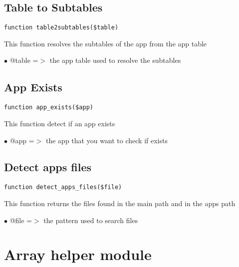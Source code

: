 \documentclass[a4paper]{book}
\begin{document}
\hypertarget{toc31}{}
\subsection{Table to Subtables}

\begin{lstlisting}
function table2subtables($table)
\end{lstlisting}

This function resolves the subtables of the app from the app table

\begin{compactitem}
\item[\color{myblue}$\bullet$] @table =$>$ the app table used to resolve the subtables
\end{compactitem}

\hypertarget{toc32}{}
\subsection{App Exists}

\begin{lstlisting}
function app_exists($app)
\end{lstlisting}

This function detect if an app exists

\begin{compactitem}
\item[\color{myblue}$\bullet$] @app =$>$ the app that you want to check if exists
\end{compactitem}

\hypertarget{toc33}{}
\subsection{Detect apps files}

\begin{lstlisting}
function detect_apps_files($file)
\end{lstlisting}

This function returns the files found in the main path and in the apps path

\begin{compactitem}
\item[\color{myblue}$\bullet$] @file =$>$ the pattern used to search files
\end{compactitem}

\hypertarget{toc34}{}
\section{Array helper module}
\end{document}
